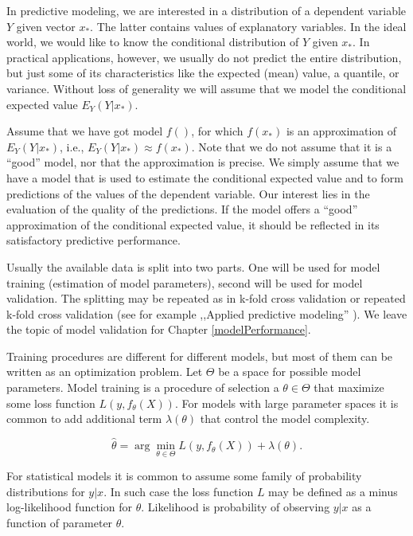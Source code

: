 \documentclass[]{krantz}
\begin{document}
In predictive modeling, we are interested in a distribution of a dependent variable \(Y\) given vector \(x_*\). The latter contains values of explanatory variables. In the ideal world, we would like to know the conditional distribution of \(Y\) given \(x_*\). In practical applications, however, we usually do not predict the entire distribution, but just some of its characteristics like the expected (mean) value, a quantile, or variance. Without loss of generality we will assume that we model the conditional expected value \(E_Y(Y | x_*)\).

Assume that we have got model \(f()\), for which \(f(x_*)\) is an approximation of \(E_Y(Y | x_*)\), i.e., \(E_Y(Y | x_*) \approx f(x_*)\). Note that we do not assume that it is a ``good'' model, nor that the approximation is precise. We simply assume that we have a model that is used to estimate the conditional expected value and to form predictions of the values of the dependent variable. Our interest lies in the evaluation of the quality of the predictions. If the model offers a ``good'' approximation of the conditional expected value, it should be reflected in its satisfactory predictive performance.

Usually the available data is split into two parts. One will be used for model training (estimation of model parameters), second will be used for model validation. The splitting may be repeated as in k-fold cross validation or repeated k-fold cross validation (see for example ,,Applied predictive modeling'' \citep{Kuhn2013}). We leave the topic of model validation for Chapter \ref{modelPerformance}.

Training procedures are different for different models, but most of them can be written as an optimization problem. Let \(\Theta\) be a space for possible model parameters. Model training is a procedure of selection a \(\theta \in \Theta\) that maximize some loss function \(L(y, f_\theta(X))\). For models with large parameter spaces it is common to add additional term \(\lambda(\theta)\) that control the model complexity.

\begin{equation}
\hat\theta = \arg \min_{\theta \in \Theta}  L (y, f_\theta(X)) + \lambda(\theta). 
\label{eq:modelTrainingEq1}
\end{equation}

For statistical models it is common to assume some family of probability distributions for \(y|x\). In such case the loss function \(L\) may be defined as a minus log-likelihood function for \(\theta\). Likelihood is probability of observing \(y|x\) as a function of parameter \(\theta\).
\end{document}
